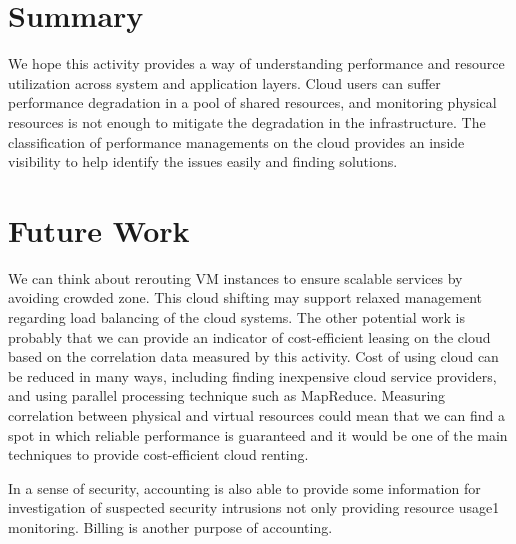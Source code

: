 \documentclass{sig-alternate}
\begin{document}
\section{Summary}

We hope this activity provides a way of understanding performance and resource utilization across system and application layers. Cloud users can suffer performance degradation in a pool of shared resources, and monitoring physical resources is not enough to mitigate the degradation in the infrastructure. The classification of performance managements on the cloud provides an inside visibility to help identify the issues easily and finding solutions.

\section{Future Work}

We can think about rerouting VM instances to ensure scalable services by avoiding crowded zone. This cloud shifting may support relaxed management regarding load balancing of the cloud systems. The other potential work is probably that we can provide an indicator of cost-efficient leasing on the cloud based on the correlation data measured by this activity. Cost of using cloud can be reduced in many ways, including finding inexpensive cloud service providers, and using parallel processing technique such as MapReduce. Measuring correlation between physical and virtual resources could mean that we can find a spot in which reliable performance is guaranteed and it would be one of the main techniques to provide cost-efficient cloud renting.

In a sense of security, accounting is also able to provide some information for investigation of suspected security intrusions not only providing resource usage1 monitoring. Billing is another purpose of accounting.
\end{document}
